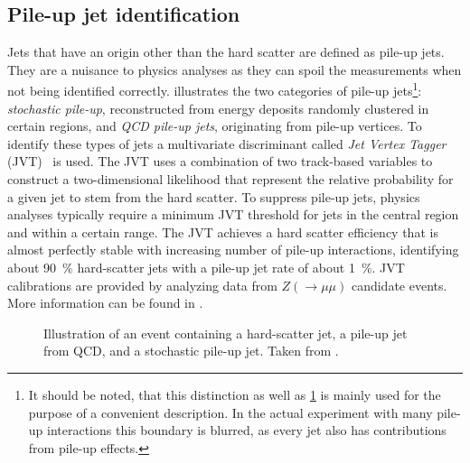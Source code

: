 \subsection{Pile-up jet identification}
Jets that have an origin other than the hard scatter are defined as pile-up jets.
They are a nuisance to physics analyses as they can spoil the measurements when not being identified correctly. 
 illustrates the two categories of pile-up jets\footnote{It should be noted, that this distinction as well as \cref{fig:pile-up-jets-illustration} is mainly used for the purpose of a convenient description. In the actual experiment with many pile-up interactions this boundary is blurred, as every jet also has contributions from pile-up effects.}:
\emph{stochastic pile-up}, reconstructed from energy deposits randomly clustered in certain regions, and \emph{QCD pile-up jets}, originating from pile-up vertices.
To identify these types of jets a multivariate discriminant called \emph{Jet Vertex Tagger} (JVT)~\cite{ATLAS-CONF-2014-018} is used. 
The JVT uses a combination of two track-based variables to construct a two-dimensional likelihood that represent the relative probability for a given jet to stem from the hard scatter. 
To suppress pile-up jets, physics analyses typically require a minimum JVT threshold for jets in the central region  and within a certain \pT range.
The JVT achieves a hard scatter efficiency that is almost perfectly stable with increasing number of pile-up interactions, identifying about \SI{90}{\percent} hard-scatter jets with a pile-up jet rate of about \SI{1}{\percent}. 
JVT calibrations are provided by analyzing data from $Z (\rightarrow \mu\mu)$ candidate events. 
More information can be found in .



\begin{figure}
    \caption{Illustration of an event containing a hard-scatter jet, a pile-up jet from QCD, and a stochastic pile-up jet. Taken from .}
    \label{fig:pile-up-jets-illustration}
\end{figure}



